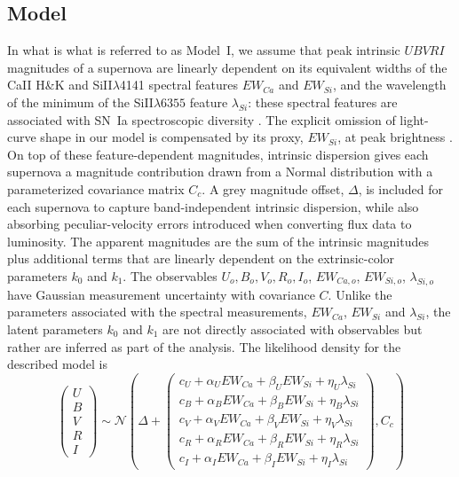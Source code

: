 \documentclass{aastex61}   	%
\begin{document}
\subsection{Model}
In what is what is referred to as Model~I, we assume 
that  peak intrinsic $UBVRI$ magnitudes of a supernova are linearly dependent
on its
 equivalent widths of the CaII H\&K and SiII$\lambda$4141 spectral features
$EW_{Ca}$ and $EW_{Si}$,
and the wavelength of the minimum of 
the SiII$\lambda6355$ feature $\lambda_{Si}$:
these spectral features are associated with SN~Ia  spectroscopic diversity  
\citep{2006PASP..118..560B, 2008A&A...492..535A, 2009A&A...500L..17B, 2009PASP..121..238B, 2009ApJ...699L.139W, 2011ApJ...729...55F}.
The explicit omission of light-curve shape in our model is compensated by its proxy,
$EW_{Si}$, at peak brightness
\citep{2008A&A...492..535A, 2011A&A...529L...4C}. On top of these feature-dependent magnitudes, intrinsic dispersion
gives each supernova a magnitude contribution drawn from a Normal distribution with a parameterized covariance matrix
$C_c$.  A grey magnitude offset, $\Delta$, is included for each supernova
to capture band-independent intrinsic dispersion, while also absorbing peculiar-velocity errors introduced when converting
flux data to luminosity.
The apparent magnitudes are the sum of the intrinsic magnitudes plus additional terms that are linearly dependent on the
extrinsic-color parameters $k_0$ and $k_1$.  
The observables
$U_o, B_o, V_o, R_o, I_o$, $EW_{Ca,o}$, $EW_{Si,o}$, $\lambda_{Si,o}$
have Gaussian measurement uncertainty with covariance $C$.
Unlike the parameters associated with
the spectral measurements, $EW_{Ca}$, $EW_{Si}$ and $\lambda_{Si}$,  the latent
parameters $k_0$ and $k_1$ are not directly associated
with observables but rather are inferred as part of the analysis.
The
likelihood density for the described model
is
\begin{equation}
\begin{pmatrix}
U\\B\\V\\R\\I
\end{pmatrix}
\sim \mathcal{N}
\left(
\Delta +
\begin{pmatrix}
c_U+\alpha_U EW_{Ca} + \beta_U EW_{Si} + \eta_U \lambda_{Si} \\
c_B+\alpha_B EW_{Ca} + \beta_B EW_{Si} + \eta_B \lambda_{Si}  \\
c_V+\alpha_V EW_{Ca} + \beta_V EW_{Si} + \eta_V \lambda_{Si} \\
c_R+\alpha_R EW_{Ca} + \beta_R EW_{Si} + \eta_R \lambda_{Si} \\
c_I+\alpha_I EW_{Ca} + \beta_I EW_{Si}+ \eta_I \lambda_{Si}
\end{pmatrix}
,C_{c}
\right)
\label{ewsiv:eqn}
\end{equation}
\end{document}
